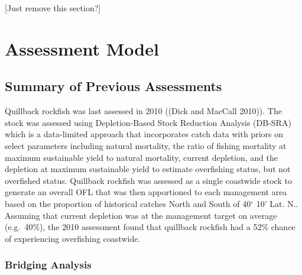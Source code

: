 \documentclass[11pt,
  english,
  a4paper,
]{article}
\begin{document}
{[}Just remove this section?{]}

\leavevmode\tagmcend\tagstructend\par


\hypertarget{assessment-model}{%
\section{Assessment Model}\label{assessment-model}}

\leavevmode\tagmcend\tagstructend


\hypertarget{summary-of-previous-assessments}{%
\subsection{Summary of Previous Assessments}\label{summary-of-previous-assessments}}

\leavevmode\tagmcend\tagstructend


Quillback rockfish was last assessed in 2010 ({(Dick and MacCall 2010)\leavevmode\tagmcend\tagstructend}). The stock was assessed using Depletion-Based Stock Reduction Analysis (DB-SRA) which is a data-limited approach that incorporates catch data with priors on select parameters including natural mortality, the ratio of fishing mortality at maximum sustainable yield to natural mortality, current depletion, and the depletion at maximum sustainable yield to estimate overfishing status, but not overfished status. Quillback rockfish was assessed as a single coastwide stock to generate an overall OFL that was then apportioned to each management area based on the proportion of historical catches North and South of 40{\(^\circ\)\leavevmode\tagmcend\tagstructend} 10' Lat. N.. Assuming that current depletion was at the management target on average (e.g.~40\%), the 2010 assessment found that quillback rockfish had a 52\% chance of experiencing overfishing coastwide.

\leavevmode\tagmcend\tagstructend\par


\hypertarget{bridging-analysis}{%
\subsubsection{Bridging Analysis}\label{bridging-analysis}}
\end{document}
